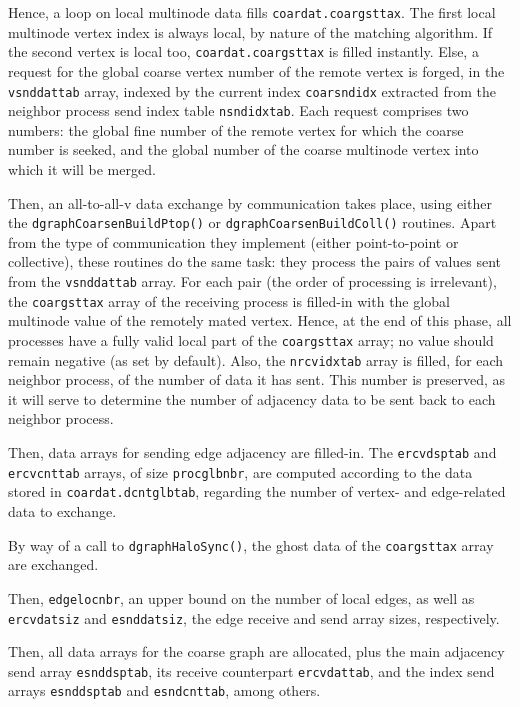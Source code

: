 Hence, a loop on local multinode data fills
\texttt{coardat.\lbt coargsttax}. The first local multinode vertex
index is always local, by nature of the matching algorithm.
If the second vertex is local too, \texttt{coardat.\lbt coargsttax} is
filled instantly. Else, a request for the global coarse vertex number
of the remote vertex is forged, in the \texttt{vsnddattab} array,
indexed by the current index \texttt{coarsndidx} extracted from the
neighbor process send index table \texttt{nsndidxtab}. Each request
comprises two numbers: the global fine number of the remote vertex for
which the coarse number is seeked, and the global number of the
coarse multinode vertex into which it will be merged.

Then, an all-to-all-v data exchange by communication takes place,
using either the \texttt{dgraph\lbt Coarsen\lbt Build\lbt Ptop()} or
\texttt{dgraph\texttt Coarsen\lbt Build\lbt Coll()} routines.  Apart
from the type of communication they implement (either point-to-point
or collective), these routines do the same task: they process the
pairs of values sent from the \texttt{vsnddattab} array. For each pair
(the order of processing is irrelevant), the \texttt{coargsttax} array
of the receiving process is filled-in with the global multinode value
of the remotely mated vertex. Hence, at the end of this phase, all
processes have a fully valid local part of the \texttt{coargsttax}
array; no value should remain negative (as set by default). Also, the
\texttt{nrcvidxtab} array is filled, for each neighbor process, of the
number of data it has sent. This number is preserved, as it will serve
to determine the number of adjacency data to be sent back to each
neighbor process.

Then, data arrays for sending edge adjacency are filled-in. The
\texttt{ercvdsptab} and \texttt{ercvcnttab} arrays, of size
\texttt{procglbnbr}, are computed according to the data stored in
\texttt{coardat.\lbt dcntglbtab}, regarding the number of vertex- and
edge-related data to exchange.

By way of a call to \texttt{dgraphHaloSync()}, the ghost data of the
\texttt{coargsttax} array are exchanged.

Then, \texttt{edgelocnbr}, an upper bound on the number of local
edges, as well as \texttt{ercvdatsiz} and \texttt{esnddatsiz}, the
edge receive and send array sizes, respectively.

Then, all data arrays for the coarse graph are allocated, plus the
main adjacency send array \texttt{esnddsptab}, its receive counterpart
\texttt{ercvdattab}, and the index send arrays \texttt{esnddsptab} and
\texttt{esndcnttab}, among others.

